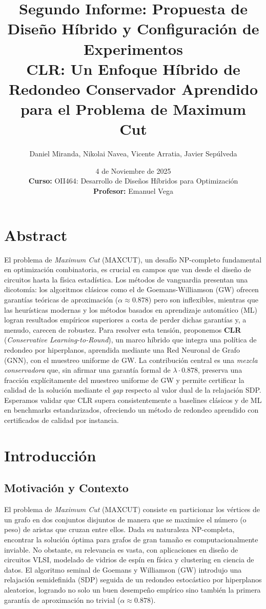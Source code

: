 \documentclass{article}
\title{\textbf{Segundo Informe: Propuesta de Diseño Híbrido y Configuración de Experimentos} \\ \large CLR: Un Enfoque Híbrido de Redondeo Conservador Aprendido para el Problema de Maximum Cut}
\author{Daniel Miranda, Nikolai Navea, Vicente Arratia, Javier Sepúlveda}
\date{4 de Noviembre de 2025 \\ [2ex] \normalsize \textbf{Curso:} OII464: Desarrollo de Diseños Híbridos para Optimización \\ \textbf{Profesor:} Emanuel Vega}
\begin{document}
\maketitle

\section{Abstract}

El problema de \textit{Maximum Cut} (MAXCUT), un desafío NP-completo fundamental en optimización combinatoria, es crucial en campos que van desde el diseño de circuitos hasta la física estadística. Los métodos de vanguardia presentan una dicotomía: los algoritmos clásicos como el de Goemans-Williamson (GW) ofrecen garantías teóricas de aproximación ($\alpha \approx 0.878$) pero son inflexibles, mientras que las heurísticas modernas y los métodos basados en aprendizaje automático (ML) logran resultados empíricos superiores a costa de perder dichas garantías y, a menudo, carecen de robustez. Para resolver esta tensión, proponemos \textbf{CLR} (\textit{Conservative Learning-to-Round}), un marco híbrido que integra una política de redondeo por hiperplanos, aprendida mediante una Red Neuronal de Grafo (GNN), con el muestreo uniforme de GW. La contribución central es una \textit{mezcla conservadora} que, sin afirmar una garantía formal de $\lambda \cdot 0.878$, preserva una fracción explícitamente del muestreo uniforme de GW y permite certificar la calidad de la solución mediante el \textit{gap} respecto al valor dual de la relajación SDP. Esperamos validar que CLR supera consistentemente a baselines clásicos y de ML en benchmarks estandarizados, ofreciendo un método de redondeo aprendido con certificados de calidad por instancia.

\section{Introducción}

\subsection{Motivación y Contexto}

El problema de \textit{Maximum Cut} (MAXCUT) consiste en particionar los vértices de un grafo en dos conjuntos disjuntos de manera que se maximice el número (o peso) de aristas que cruzan entre ellos. Dada su naturaleza NP-completa, encontrar la solución óptima para grafos de gran tamaño es computacionalmente inviable. No obstante, su relevancia es vasta, con aplicaciones en diseño de circuitos VLSI, modelado de vidrios de espín en física y clustering en ciencia de datos. El algoritmo seminal de Goemans y Williamson (GW) introdujo una relajación semidefinida (SDP) seguida de un redondeo estocástico por hiperplanos aleatorios, logrando no solo un buen desempeño empírico sino también la primera garantía de aproximación no trivial ($\alpha \approx 0.878$).
\end{document}
